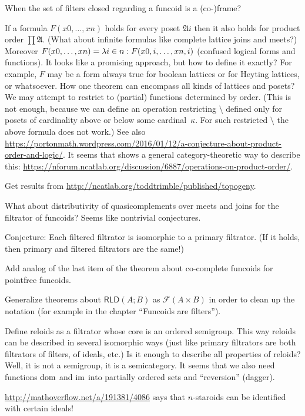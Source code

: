 \documentclass{amsart}
\begin{document}
When the set of filters closed regarding a funcoid is a (co-)frame?

If a formula $F(x 0,\dots,x n)$ holds for every poset $\mathfrak{A} i$ then it also holds for product order $\prod\mathfrak{A}$.
(What about infinite formulas like complete lattice joins and meets?)
Moreover $F(x 0,\dots,x n) = \lambda i\in n:F(x {0,i},\dots,x {n,i})$ (confused logical forms and functions).
It looks like a promising approach, but how to define it exactly? For example, $F$ may be a form always true for boolean
lattices or for Heyting lattices, or whatsoever. How one theorem can encompass all kinds of lattices and posets?
We may attempt to restrict to (partial) functions determined by order.
(This is not enough, because we can define an operation restricting $\setminus$ defined only for posets
of cardinality above or below some cardinal~$\kappa$. For such restricted $\setminus$ the above formula does not work.)
See also \url{https://portonmath.wordpress.com/2016/01/12/a-conjecture-about-product-order-and-logic/}.
It seems that  shows a general category-theoretic way to describe this:
\url{https://nforum.ncatlab.org/discussion/6887/operations-on-product-order/}.

Get results from \url{http://ncatlab.org/toddtrimble/published/topogeny}.

What about distributivity of quasicomplements over meets and joins for the filtrator of funcoids? Seems like nontrivial conjectures.

Conjecture: Each filtered filtrator is isomorphic to a primary filtrator. (If it holds, then primary and filtered filtrators are the same!)

Add analog of the last item of the theorem about co-complete funcoids for pointfree funcoids.

Generalize theorems about $\mathsf{RLD}(A;B)$ as $\mathscr{F}(A\times B)$ in order to clean up the notation
(for example in the chapter ``Funcoids are filters'').

Define reloids as a filtrator whose core is an ordered semigroup.
This way reloids can be described in several isomorphic ways (just like primary filtrators are both filtrators of filters, of ideals, etc.)
Is it enough to describe all properties of reloids? Well, it is not a semigroup, it is a semicategory.
It seems that we also need functions $\operatorname{dom}$ and $\operatorname{im}$ into partially ordered sets and ``reversion'' (dagger).

\url{http://mathoverflow.net/a/191381/4086} says that $n$-staroids can be identified with certain ideals!
\end{document}
